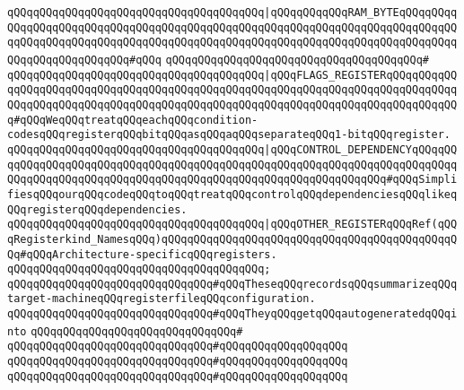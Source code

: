\verb|qQQqqQQqqQQqqQQqqQQqqQQqqQQqqQQqqQQqqQQq|\verb#|qQQqqQQqqQQqRAM_BYTEqQQqqQQqqQQqqQQqqQQqqQQqqQQqqQQqqQQqqQQqqQQqqQQqqQQqqQQqqQQqqQQqqQQqqQQqqQQqqQQqqQQqqQQqqQQqqQQqqQQqqQQqqQQqqQQqqQQqqQQqqQQqqQQqqQQqqQQqqQQqqQQqqQQqqQQqqQQqqQQqqQQqqQQq#\verb|#qQQq|\newline
\verb|qQQqqQQqqQQqqQQqqQQqqQQqqQQqqQQqqQQqqQQq#|\newline
\verb|qQQqqQQqqQQqqQQqqQQqqQQqqQQqqQQqqQQqqQQq|\verb#|qQQqFLAGS_REGISTERqQQqqQQqqQQqqQQqqQQqqQQqqQQqqQQqqQQqqQQqqQQqqQQqqQQqqQQqqQQqqQQqqQQqqQQqqQQqqQQqqQQqqQQqqQQqqQQqqQQqqQQqqQQqqQQqqQQqqQQqqQQqqQQqqQQqqQQqqQQqqQQqqQQqqQQq#\verb|#qQQqWeqQQqtreatqQQqeachqQQqcondition-codesqQQqregisterqQQqbitqQQqasqQQqaqQQqseparateqQQq1-bitqQQqregister.|\newline
\verb|qQQqqQQqqQQqqQQqqQQqqQQqqQQqqQQqqQQqqQQq|\verb#|qQQqCONTROL_DEPENDENCYqQQqqQQqqQQqqQQqqQQqqQQqqQQqqQQqqQQqqQQqqQQqqQQqqQQqqQQqqQQqqQQqqQQqqQQqqQQqqQQqqQQqqQQqqQQqqQQqqQQqqQQqqQQqqQQqqQQqqQQqqQQqqQQqqQQqqQQq#\verb|#qQQqSimplifiesqQQqourqQQqcodeqQQqtoqQQqtreatqQQqcontrolqQQqdependenciesqQQqlikeqQQqregisterqQQqdependencies.|\newline
\verb|qQQqqQQqqQQqqQQqqQQqqQQqqQQqqQQqqQQqqQQq|\verb#|qQQqOTHER_REGISTERqQQqRef(qQQqRegisterkind_NamesqQQq)qQQqqQQqqQQqqQQqqQQqqQQqqQQqqQQqqQQqqQQqqQQqqQQq#\verb|#qQQqArchitecture-specificqQQqregisters.|\newline
\verb|qQQqqQQqqQQqqQQqqQQqqQQqqQQqqQQqqQQqqQQq;|\newline
\newline
\verb|qQQqqQQqqQQqqQQqqQQqqQQqqQQqqQQq#qQQqTheseqQQqrecordsqQQqsummarizeqQQqtarget-machineqQQqregisterfileqQQqconfiguration.|\newline
\verb|qQQqqQQqqQQqqQQqqQQqqQQqqQQqqQQq#qQQqTheyqQQqgetqQQqautogeneratedqQQqinto|\newline
\verb|qQQqqQQqqQQqqQQqqQQqqQQqqQQqqQQq#|\newline
\verb|qQQqqQQqqQQqqQQqqQQqqQQqqQQqqQQq#qQQqqQQqqQQqqQQqqQQq|\newline
\verb|qQQqqQQqqQQqqQQqqQQqqQQqqQQqqQQq#qQQqqQQqqQQqqQQqqQQq|\newline
\verb|qQQqqQQqqQQqqQQqqQQqqQQqqQQqqQQq#qQQqqQQqqQQqqQQqqQQq|\newline

